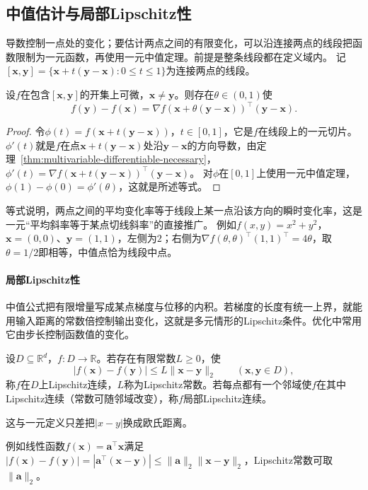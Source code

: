 \subsection{中值估计与局部Lipschitz性}

导数控制一点处的变化；要估计两点之间的有限变化，可以沿连接两点的线段把函数限制为一元函数，再使用一元中值定理。前提是整条线段都在定义域内。
记$[\bm x,\bm y]=\{\bm x+t(\bm y-\bm x):0\leq t\leq1\}$为连接两点的线段。
\begin{theorem}[多元标量函数的中值公式]
\label{thm:multivariable-scalar-mean-value}
设$f$在包含$[\bm x,\bm y]$的开集上可微，$\bm x\neq\bm y$。则存在$\theta\in(0,1)$使
\[
 f(\bm y)-f(\bm x)=\nabla f(\bm x+\theta(\bm y-\bm x))^\top(\bm y-\bm x).
\]
\end{theorem}
\begin{proof}
令$\phi(t)=f(\bm x+t(\bm y-\bm x))$，$t\in[0,1]$，它是$f$在线段上的一元切片。$\phi'(t)$就是$f$在点$\bm x+t(\bm y-\bm x)$处沿$\bm y-\bm x$的方向导数，由定理~\ref{thm:multivariable-differentiable-necessary}，$\phi'(t)=\nabla f(\bm x+t(\bm y-\bm x))^\top(\bm y-\bm x)$。
对$\phi$在$[0,1]$上使用一元中值定理，$\phi(1)-\phi(0)=\phi'(\theta)$，这就是所述等式。
\end{proof}
等式说明，两点之间的平均变化率等于线段上某一点沿该方向的瞬时变化率，这是一元“平均斜率等于某点切线斜率”的直接推广。
例如$f(x,y)=x^2+y^2$，$\bm x=(0,0)$、$\bm y=(1,1)$，左侧为$2$；右侧为$\nabla f(\theta,\theta)^\top(1,1)^\top=4\theta$，取$\theta=1/2$即相等，中值点恰为线段中点。

\paragraph{局部Lipschitz性}

中值公式把有限增量写成某点梯度与位移的内积。若梯度的长度有统一上界，就能用输入距离的常数倍控制输出变化，这就是多元情形的Lipschitz条件。优化中常用它由步长控制函数值的变化。
\begin{definition}[多元函数的Lipschitz条件]
\label{def:multivariable-lipschitz}
设$D\subseteq\mathbb R^d$，$f:D\to\mathbb R$。若存在有限常数$L\geq0$，使
\[
 |f(\bm x)-f(\bm y)|\leq L\lVert\bm x-\bm y\rVert_2\qquad(\bm x,\bm y\in D),
\]
称$f$在$D$上Lipschitz连续，$L$称为Lipschitz常数。若每点都有一个邻域使$f$在其中Lipschitz连续（常数可随邻域改变），称$f$局部Lipschitz连续。
\end{definition}
这与一元定义只差把$|x-y|$换成欧氏距离。

例如线性函数$f(\bm x)=\bm a^\top\bm x$满足$|f(\bm x)-f(\bm y)|=|\bm a^\top(\bm x-\bm y)|\leq\lVert\bm a\rVert_2\lVert\bm x-\bm y\rVert_2$，Lipschitz常数可取$\lVert\bm a\rVert_2$。

